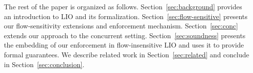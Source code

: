 The rest of the paper is organized as
follows. Section~\ref{sec:background} provides an introduction to LIO
and its formalization.  Section~\ref{sec:flow-sensitive} presents our
flow-sensitivity extensions and enforcement
mechanism. Section~\ref{sec:conc} extends our approach to the
concurrent setting. Section~\ref{sec:soundness} presents the embedding
of our enforcement in flow-insensitive LIO and uses it to provide
formal guarantees. We describe related work in
Section~\ref{sec:related} and conclude in
Section~\ref{sec:conclusion}.


